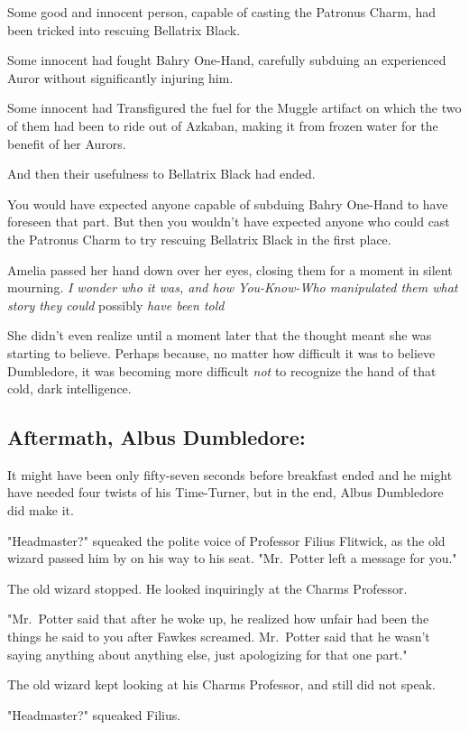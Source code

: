 Some good and innocent person, capable of casting the Patronus Charm, had been
tricked into rescuing Bellatrix Black.

Some innocent had fought Bahry One-Hand, carefully subduing an experienced
Auror without significantly injuring him.

Some innocent had Transfigured the fuel for the Muggle artifact on which the
two of them had been to ride out of Azkaban, making it from frozen water for
the benefit of her Aurors.

And then their usefulness to Bellatrix Black had ended.

You would have expected anyone capable of subduing Bahry One-Hand to have
foreseen that part. But then you wouldn't have expected anyone who could cast
the Patronus Charm to try rescuing Bellatrix Black in the first place.

Amelia passed her hand down over her eyes, closing them for a moment in silent
mourning. \emph{I wonder who it was, and how You-Know-Who manipulated
them{\el} what story they could} possibly \emph{have been told{\el}}

She didn't even realize until a moment later that the thought meant she was
starting to believe. Perhaps because, no matter how difficult it was to believe
Dumbledore, it was becoming more difficult \emph{not} to recognize the hand of
that cold, dark intelligence.
\sbreak
\subsection{Aftermath, Albus Dumbledore:}

It might have been only fifty-seven seconds before breakfast ended and he might
have needed four twists of his Time-Turner, but in the end, Albus Dumbledore
did make it.

"Headmaster?" squeaked the polite voice of Professor Filius Flitwick, as the
old wizard passed him by on his way to his seat. "Mr.~Potter left a message for
you."

The old wizard stopped. He looked inquiringly at the Charms Professor.

"Mr.~Potter said that after he woke up, he realized how unfair had been the
things he said to you after Fawkes screamed. Mr.~Potter said that he wasn't
saying anything about anything else, just apologizing for that one part."

The old wizard kept looking at his Charms Professor, and still did not speak.

"Headmaster?" squeaked Filius.

